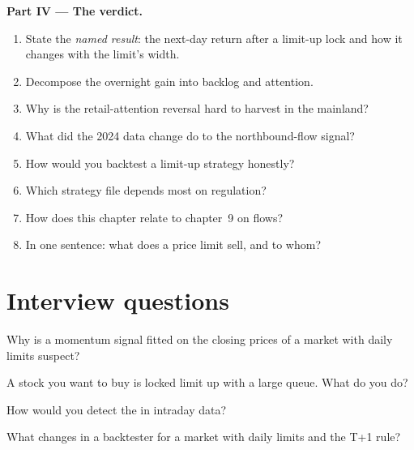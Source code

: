 \begin{problem}
\medskip\noindent\textbf{Part IV --- The verdict.}
\begin{enumerate}[resume]
\item State the \emph{named result}: the next-day return after a limit-up lock and how it changes with the limit's width.
\item Decompose the overnight gain into backlog and attention.
\item Why is the retail-attention reversal hard to harvest in the mainland?
\item What did the 2024 data change do to the northbound-flow signal?
\item How would you backtest a limit-up strategy honestly?
\item Which strategy file depends most on regulation?
\item How does this chapter relate to chapter~9 on flows?
\item In one sentence: what does a price limit sell, and to whom?
\end{enumerate}
\end{problem}

\section{Interview questions}

\begin{interviewq}\label{iq:s1:asia-specific-equity-strategies:1}
Why is a momentum signal fitted on the closing prices of a market with daily limits suspect?
\end{interviewq}

\begin{interviewq}\label{iq:s1:asia-specific-equity-strategies:2}
A stock you want to buy is locked limit up with a large queue. What do you do?
\end{interviewq}

\begin{interviewq}\label{iq:s1:asia-specific-equity-strategies:3}
How would you detect the  in intraday data?
\end{interviewq}

\begin{interviewq}\label{iq:s1:asia-specific-equity-strategies:4}
What changes in a backtester for a market with daily limits and the T+1 rule?
\end{interviewq}

